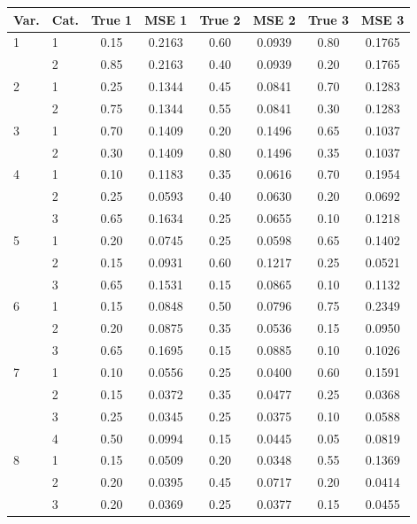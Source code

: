 \begin{table}[H]
\centering
\begin{tabular}{llcccccc}
  \toprule
\textbf{Var.} & \textbf{Cat.} & \textbf{True 1} & \textbf{MSE 1} & \textbf{True 2} & \textbf{MSE 2} & \textbf{True 3} & \textbf{MSE 3} \\ 
  \midrule
1 & 1 & 0.15 & 0.2163 & 0.60 & 0.0939 & 0.80 & 0.1765 \\ 
   & 2 & 0.85 & 0.2163 & 0.40 & 0.0939 & 0.20 & 0.1765 \\ 
  2 & 1 & 0.25 & 0.1344 & 0.45 & 0.0841 & 0.70 & 0.1283 \\ 
   & 2 & 0.75 & 0.1344 & 0.55 & 0.0841 & 0.30 & 0.1283 \\ 
  3 & 1 & 0.70 & 0.1409 & 0.20 & 0.1496 & 0.65 & 0.1037 \\ 
   & 2 & 0.30 & 0.1409 & 0.80 & 0.1496 & 0.35 & 0.1037 \\ 
  4 & 1 & 0.10 & 0.1183 & 0.35 & 0.0616 & 0.70 & 0.1954 \\ 
   & 2 & 0.25 & 0.0593 & 0.40 & 0.0630 & 0.20 & 0.0692 \\ 
   & 3 & 0.65 & 0.1634 & 0.25 & 0.0655 & 0.10 & 0.1218 \\ 
  5 & 1 & 0.20 & 0.0745 & 0.25 & 0.0598 & 0.65 & 0.1402 \\ 
   & 2 & 0.15 & 0.0931 & 0.60 & 0.1217 & 0.25 & 0.0521 \\ 
   & 3 & 0.65 & 0.1531 & 0.15 & 0.0865 & 0.10 & 0.1132 \\ 
  6 & 1 & 0.15 & 0.0848 & 0.50 & 0.0796 & 0.75 & 0.2349 \\ 
   & 2 & 0.20 & 0.0875 & 0.35 & 0.0536 & 0.15 & 0.0950 \\ 
   & 3 & 0.65 & 0.1695 & 0.15 & 0.0885 & 0.10 & 0.1026 \\ 
  7 & 1 & 0.10 & 0.0556 & 0.25 & 0.0400 & 0.60 & 0.1591 \\ 
   & 2 & 0.15 & 0.0372 & 0.35 & 0.0477 & 0.25 & 0.0368 \\ 
   & 3 & 0.25 & 0.0345 & 0.25 & 0.0375 & 0.10 & 0.0588 \\ 
   & 4 & 0.50 & 0.0994 & 0.15 & 0.0445 & 0.05 & 0.0819 \\ 
  8 & 1 & 0.15 & 0.0509 & 0.20 & 0.0348 & 0.55 & 0.1369 \\ 
   & 2 & 0.20 & 0.0395 & 0.45 & 0.0717 & 0.20 & 0.0414 \\ 
   & 3 & 0.20 & 0.0369 & 0.25 & 0.0377 & 0.15 & 0.0455 \\ 

\end{tabular}
\end{table}
